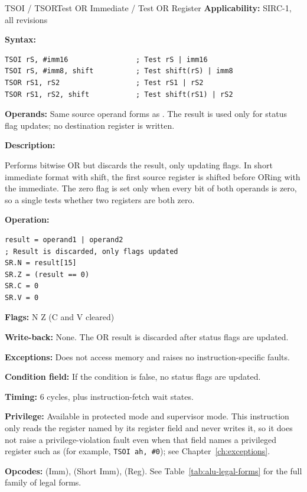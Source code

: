 \begin{instructionbox}{TSOI / TSOR}{Test OR Immediate / Test OR Register}
	\textbf{Applicability:} SIRC-1, all revisions

	\textbf{Syntax:}
	\begin{lstlisting}
TSOI rS, #imm16                ; Test rS | imm16
TSOI rS, #imm8, shift          ; Test shift(rS) | imm8
TSOR rS1, rS2                  ; Test rS1 | rS2
TSOR rS1, rS2, shift           ; Test shift(rS1) | rS2
\end{lstlisting}

	\textbf{Operands:} Same source operand forms as . The result is used only for status flag updates; no
	destination register is written.

	\textbf{Description:}

	Performs bitwise OR but discards the result, only updating flags. In short immediate format with shift, the first
	source register is shifted before ORing with the immediate. The zero flag is set only when every bit of both operands
	is zero, so a single  tests whether two registers are both zero.

	\textbf{Operation:}
	\begin{verbatim}
result = operand1 | operand2
; Result is discarded, only flags updated
SR.N = result[15]
SR.Z = (result == 0)
SR.C = 0
SR.V = 0
\end{verbatim}

	\textbf{Flags:} N Z (C and V cleared)

	\textbf{Write-back:} None. The OR result is discarded after status flags are updated.

	\textbf{Exceptions:} Does not access memory and raises no instruction-specific faults.

	\textbf{Condition field:} If the condition is false, no status flags are updated.

	\textbf{Timing:} 6 cycles, plus instruction-fetch wait states.

	\textbf{Privilege:} Available in protected mode and supervisor mode. This instruction only reads the register named
	by its register field and never writes it, so it does not raise a privilege-violation fault even when that field
	names a privileged register such as  (for example, \texttt{TSOI ah, \#0}); see
	Chapter~\ref{ch:exceptions}.

	\textbf{Opcodes:}  (Imm),  (Short Imm),  (Reg). See Table~\ref{tab:alu-legal-forms} for the full family of legal forms.


\end{instructionbox}
